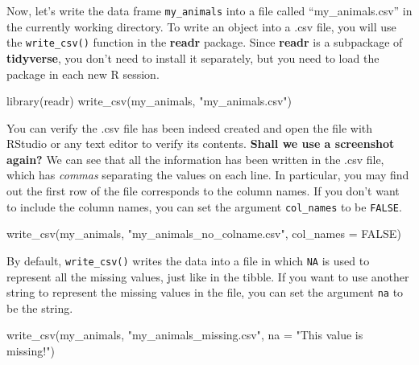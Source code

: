 \documentclass[
]{book}
\newenvironment{Shaded}{\begin{snugshade}}{\end{snugshade}}
\newcommand{\AttributeTok}[1]{\textcolor[rgb]{0.77,0.63,0.00}{#1}}
\newcommand{\ConstantTok}[1]{\textcolor[rgb]{0.00,0.00,0.00}{#1}}
\newcommand{\FunctionTok}[1]{\textcolor[rgb]{0.00,0.00,0.00}{#1}}
\newcommand{\NormalTok}[1]{#1}
\newcommand{\StringTok}[1]{\textcolor[rgb]{0.31,0.60,0.02}{#1}}
\begin{document}
Now, let's write the data frame \texttt{my\_animals} into a file called ``my\_animals.csv'' in the currently working directory. To write an object into a .csv file, you will use the \texttt{write\_csv()} function in the \textbf{readr} package. Since \textbf{readr} is a subpackage of \textbf{tidyverse}, you don't need to install it separately, but you need to load the package in each new R session.

\begin{Shaded}
\begin{Highlighting}[]
\FunctionTok{library}\NormalTok{(readr)}
\FunctionTok{write\_csv}\NormalTok{(my\_animals, }\StringTok{"my\_animals.csv"}\NormalTok{)}
\end{Highlighting}
\end{Shaded}

You can verify the .csv file has been indeed created and open the file with RStudio or any text editor to verify its contents. \textbf{Shall we use a screenshot again?}
We can see that all the information has been written in the .csv file, which has \emph{commas} separating the values on each line. In particular, you may find out the first row of the file corresponds to the column names. If you don't want to include the column names, you can set the argument \texttt{col\_names} to be \texttt{FALSE}.

\begin{Shaded}
\begin{Highlighting}[]
\FunctionTok{write\_csv}\NormalTok{(my\_animals, }\StringTok{"my\_animals\_no\_colname.csv"}\NormalTok{, }\AttributeTok{col\_names =} \ConstantTok{FALSE}\NormalTok{)}
\end{Highlighting}
\end{Shaded}

By default, \texttt{write\_csv()} writes the data into a file in which \texttt{NA} is used to represent all the missing values, just like in the tibble. If you want to use another string to represent the missing values in the file, you can set the argument \texttt{na} to be the string.

\begin{Shaded}
\begin{Highlighting}[]
\FunctionTok{write\_csv}\NormalTok{(my\_animals, }\StringTok{"my\_animals\_missing.csv"}\NormalTok{, }\AttributeTok{na =} \StringTok{"This value is missing!"}\NormalTok{)}
\end{Highlighting}
\end{Shaded}
\end{document}
